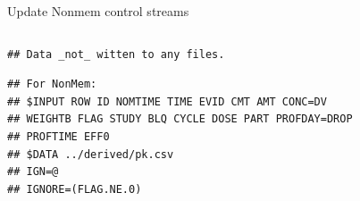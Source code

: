 \documentclass[
  8pt,
  ignorenonframetext,
  aspectratio=169]{beamer}
\newenvironment{Shaded}{\begin{snugshade}}{\end{snugshade}}
\newcommand{\CharTok}[1]{\textcolor[rgb]{0.31,0.60,0.02}{#1}}
\newcommand{\CommentTok}[1]{\textcolor[rgb]{0.56,0.35,0.01}{\textit{#1}}}
\newcommand{\DataTypeTok}[1]{\textcolor[rgb]{0.13,0.29,0.53}{#1}}
\newcommand{\KeywordTok}[1]{\textcolor[rgb]{0.13,0.29,0.53}{\textbf{#1}}}
\newcommand{\NormalTok}[1]{#1}
\newcommand{\OperatorTok}[1]{\textcolor[rgb]{0.81,0.36,0.00}{\textbf{#1}}}
\newcommand{\StringTok}[1]{\textcolor[rgb]{0.31,0.60,0.02}{#1}}
\begin{document}
\begin{frame}[fragile]{Update Nonmem control streams}
\begin{columns}[T]
\begin{column}{0.48\textwidth}
\begin{verbatim}
## Data _not_ witten to any files.
\end{verbatim}

\begin{verbatim}
## For NonMem:
## $INPUT ROW ID NOMTIME TIME EVID CMT AMT CONC=DV
## WEIGHTB FLAG STUDY BLQ CYCLE DOSE PART PROFDAY=DROP
## PROFTIME EFF0
## $DATA ../derived/pk.csv
## IGN=@
## IGNORE=(FLAG.NE.0)
\end{verbatim}

\begin{Shaded}
\end{Shaded}

\normalsize
\end{column}
\end{columns}
\end{frame}
\end{document}

